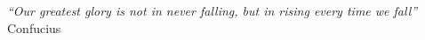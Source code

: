 \cleardoublepage
\thispagestyle{plain}

\vspace*{8cm}

\begin{flushright}
   \textsl{``Our greatest glory is not in never falling, but in rising every time we fall''} \\
\vspace*{1.5cm}
    Confucius
\end{flushright}
